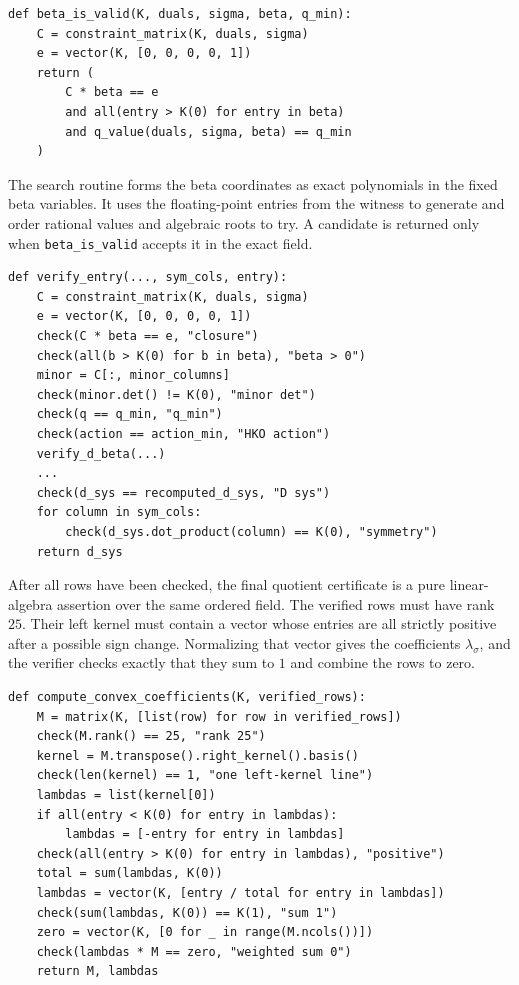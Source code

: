 \begin{verbatim}
def beta_is_valid(K, duals, sigma, beta, q_min):
    C = constraint_matrix(K, duals, sigma)
    e = vector(K, [0, 0, 0, 0, 1])
    return (
        C * beta == e
        and all(entry > K(0) for entry in beta)
        and q_value(duals, sigma, beta) == q_min
    )
\end{verbatim}

The search routine forms the beta coordinates as exact polynomials in the
fixed beta variables. It uses the floating-point entries from the witness to
generate and order rational values and algebraic roots to try. A candidate is
returned only when \verb|beta_is_valid| accepts it in the exact field.

\begin{verbatim}
def verify_entry(..., sym_cols, entry):
    C = constraint_matrix(K, duals, sigma)
    e = vector(K, [0, 0, 0, 0, 1])
    check(C * beta == e, "closure")
    check(all(b > K(0) for b in beta), "beta > 0")
    minor = C[:, minor_columns]
    check(minor.det() != K(0), "minor det")
    check(q == q_min, "q_min")
    check(action == action_min, "HKO action")
    verify_d_beta(...)
    ...
    check(d_sys == recomputed_d_sys, "D sys")
    for column in sym_cols:
        check(d_sys.dot_product(column) == K(0), "symmetry")
    return d_sys
\end{verbatim}

After all rows have been checked, the final quotient certificate is a pure
linear-algebra assertion over the same ordered field. The verified rows must
have rank \(25\). Their left kernel must contain a vector whose entries are all
strictly positive after a possible sign change. Normalizing that vector gives
the coefficients \(\lambda_\sigma\), and the verifier checks exactly that they
sum to \(1\) and combine the rows to zero.

\begin{verbatim}
def compute_convex_coefficients(K, verified_rows):
    M = matrix(K, [list(row) for row in verified_rows])
    check(M.rank() == 25, "rank 25")
    kernel = M.transpose().right_kernel().basis()
    check(len(kernel) == 1, "one left-kernel line")
    lambdas = list(kernel[0])
    if all(entry < K(0) for entry in lambdas):
        lambdas = [-entry for entry in lambdas]
    check(all(entry > K(0) for entry in lambdas), "positive")
    total = sum(lambdas, K(0))
    lambdas = vector(K, [entry / total for entry in lambdas])
    check(sum(lambdas, K(0)) == K(1), "sum 1")
    zero = vector(K, [0 for _ in range(M.ncols())])
    check(lambdas * M == zero, "weighted sum 0")
    return M, lambdas
\end{verbatim}

